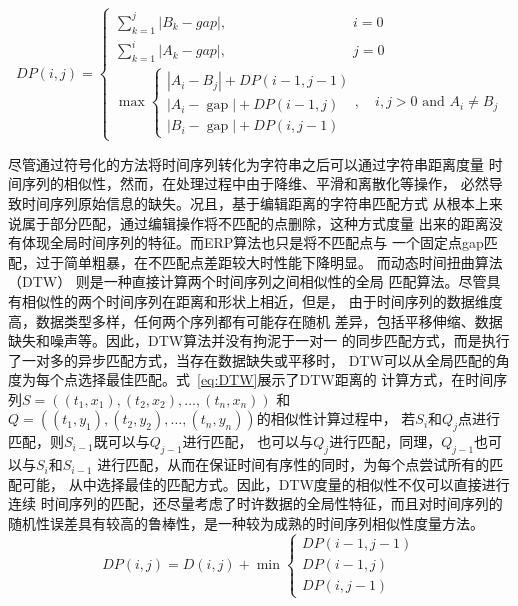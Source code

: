 \begin{equation}
  D P(i, j)= \begin{cases}\sum_{k=1}^{j}\left|B_{k}-g a p\right|, \qquad \qquad \qquad \qquad \quad i=0 \\
    \sum_{k=1}^{i}\left|A_{k}-g a p\right|,\qquad \qquad \qquad \qquad \quad j=0 \\
    \max \left\{\begin{array}{l}
    \left|A_{i}-B_{j}\right|+D P(i-1, j-1) \\
    \left|A_{i}-\operatorname{gap}\right|+D P(i-1, j) \\
    \left|B_{i}-\operatorname{gap}\right|+D P(i, j-1)
    \end{array}, \quad i, j>0 \text { and } A_{i} \neq B_{j}\right.\end{cases}
    \label{eq:ERP}
\end{equation}

尽管通过符号化的方法将时间序列转化为字符串之后可以通过字符串距离度量
时间序列的相似性，然而，在处理过程中由于降维、平滑和离散化等操作，
必然导致时间序列原始信息的缺失。况且，基于编辑距离的字符串匹配方式
从根本上来说属于部分匹配，通过编辑操作将不匹配的点删除，这种方式度量
出来的距离没有体现全局时间序列的特征。而ERP算法也只是将不匹配点与
一个固定点gap匹配，过于简单粗暴，在不匹配点差距较大时性能下降明显。
而动态时间扭曲算法（DTW）\cite{DBLP:conf/kdd/BerndtC94,DBLP:conf/sdm/KeoghP01}
则是一种直接计算两个时间序列之间相似性的全局
匹配算法。尽管具有相似性的两个时间序列在距离和形状上相近，但是，
由于时间序列的数据维度高，数据类型多样，任何两个序列都有可能存在随机
差异，包括平移伸缩、数据缺失和噪声等。因此，DTW算法并没有拘泥于一对一
的同步匹配方式，而是执行了一对多的异步匹配方式，当存在数据缺失或平移时，
DTW可以从全局匹配的角度为每个点选择最佳匹配。式~\ref{eq:DTW}展示了DTW距离的
计算方式，在时间序列$S=((t_1,x_1 ),(t_2,x_2 ),\dots,(t_n,x_n ))$
和$Q=((t_1,y_1 ),(t_2,y_2 ),\dots,(t_n,y_n ))$的相似性计算过程中，
若$S_i$和$Q_j$点进行匹配，则$S_{i-1}$既可以与$Q_{j-1}$进行匹配，
也可以与$Q_j$进行匹配，同理，$Q_{j-1}$也可以与$S_i$和$S_{i-1}$
进行匹配，从而在保证时间有序性的同时，为每个点尝试所有的匹配可能，
从中选择最佳的匹配方式。因此，DTW度量的相似性不仅可以直接进行连续
时间序列的匹配，还尽量考虑了时许数据的全局性特征，而且对时间序列的
随机性误差具有较高的鲁棒性，是一种较为成熟的时间序列相似性度量方法。
\begin{equation}
  D P(i, j)=D(i, j)+\min \left\{\begin{array}{c}
    D P(i-1, j-1) \\
    D P(i-1, j) \\
    D P(i, j-1)
    \end{array}\right.
    \label{eq:DTW}
\end{equation}


